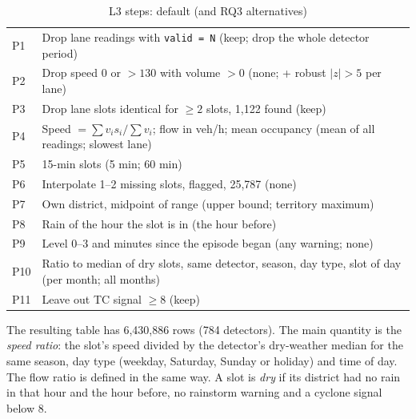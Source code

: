 \documentclass[conference]{IEEEtran}
\begin{document}
\begin{table}[t]
\centering
\caption{L3 steps: default (and RQ3 alternatives)}
\label{tab:l3}
\footnotesize
\begin{tabular}{@{}p{0.55cm}p{7.0cm}@{}}
\toprule
P1 & Drop lane readings with \texttt{valid = N} (keep; drop the whole detector period) \\
P2 & Drop speed 0 or $>130$ with volume $>0$ (none; + robust $|z|>5$ per lane) \\
P3 & Drop lane slots identical for $\geq 2$ slots, 1,122 found (keep) \\
P4 & Speed $=\sum v_i s_i / \sum v_i$; flow in veh/h; mean occupancy (mean of all readings; slowest lane) \\
P5 & 15-min slots (5 min; 60 min) \\
P6 & Interpolate 1--2 missing slots, flagged, 25,787 (none) \\
P7 & Own district, midpoint of range (upper bound; territory maximum) \\
P8 & Rain of the hour the slot is in (the hour before) \\
P9 & Level 0--3 and minutes since the episode began (any warning; none) \\
P10 & Ratio to median of dry slots, same detector, season, day type, slot of day (per month; all months) \\
P11 & Leave out TC signal $\geq 8$ (keep) \\
\bottomrule
\end{tabular}
\end{table}

The resulting table has 6,430,886 rows (784 detectors). The main quantity is the
\emph{speed ratio}: the slot's speed divided by the detector's dry-weather median for the same
season, day type (weekday, Saturday, Sunday or holiday) and time of day. The flow ratio is
defined in the same way. A slot is \emph{dry} if its district had no rain in that hour and the
hour before, no rainstorm warning and a cyclone signal below 8.
\end{document}
